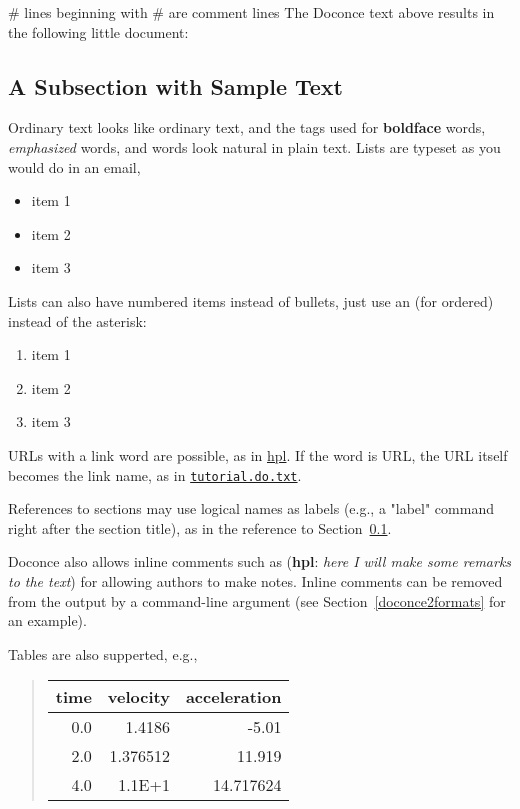 \documentclass[twoside]{book}
\newcommand{\inlinecomment}[2]{  ({\bf #1}: \emph{#2})  }
\begin{document}
# lines beginning with # are comment lines
\eccq
The Doconce text above results in the following little document:

\subsection{A Subsection with Sample Text}

\label{my:first:sec}

Ordinary text looks like ordinary text, and the tags used for
\textbf{boldface} words, \emph{emphasized} words, and  words look
natural in plain text.  Lists are typeset as you would do in an email,

\begin{itemize}
  \item item 1

  \item item 2

  \item item 3
\end{itemize}

\noindent
Lists can also have numbered items instead of bullets, just use an 
(for ordered) instead of the asterisk:

\begin{enumerate}
 \item item 1

 \item item 2

 \item item 3
\end{enumerate}

\noindent
URLs with a link word are possible, as in \href{{http://folk.uio.no/hpl}}{hpl}.
If the word is URL, the URL itself becomes the link name,
as in \href{{tutorial.do.txt}}{\nolinkurl{tutorial.do.txt}}.

References to sections may use logical names as labels (e.g., a
"label" command right after the section title), as in the reference to
Section~\ref{my:first:sec}.

Doconce also allows inline comments such as \inlinecomment{hpl}{here I will make
some remarks to the text} for allowing authors to make notes. Inline
comments can be removed from the output by a command-line argument
(see Section~\ref{doconce2formats} for an example).

Tables are also supperted, e.g.,


\begin{quote}\begin{tabular}{rrr}
\hline
\multicolumn{1}{c}{time} & \multicolumn{1}{c}{velocity} & \multicolumn{1}{c}{acceleration} \\
\hline
0.0          & 1.4186       & -5.01        \\
2.0          & 1.376512     & 11.919       \\
4.0          & 1.1E+1       & 14.717624    \\
\hline
\end{tabular}\end{quote}
\end{document}
